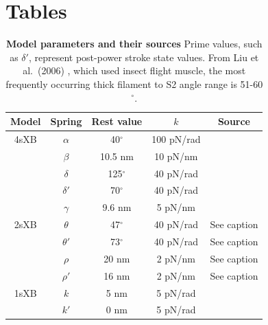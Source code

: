 \documentclass[10pt]{article}
\newcommand{\citep}[1]{\cite{#1}} %
\newcommand{\citet}[1]{\cite{#1}}
\newcommand{\de}{$^\circ$} %
\begin{document}

\clearpage
\section*{Tables} %

\begin{table}[ht]
    \begin{center}
    \begin{tabular}[t]{|c|c|c|c|c|} \hline
    Model & Spring    & Rest value & $k$        & Source \\ \hline %
    4sXB  & $\alpha$  & 40\de      & 100 pN/rad & \citet{Liu2006}      \\ \hline
          & $\beta$   & 10.5 nm    & 10 pN/nm   & \citet{Liu2006}      \\ \hline
          & $\delta$  & 125\de     & 40 pN/rad  & \citet{Taylor1999}   \\ \hline
          & $\delta'$ & 70\de      & 40 pN/rad  & \citet{Taylor1999}   \\ \hline
          & $\gamma$  & 9.6 nm     & 5 pN/nm    & \citet{Houdusse2000} \\ \hline
    2sXB  & $\theta$  & 47\de      & 40 pN/rad  & See caption \\ \hline
          & $\theta'$ & 73\de      & 40 pN/rad  & See caption \\ \hline
          & $\rho$    & 20 nm      & 2 pN/nm    & See caption \\ \hline
          & $\rho'$   & 16 nm      & 2 pN/nm    & See caption \\ \hline
    1sXB  & $k$       & 5 nm       & 5 pN/rad   & \citet{Tanner2007} \\ \hline
          & $k'$      & 0 nm       & 5 pN/rad   & \citet{Tanner2007} \\ \hline
    \end{tabular}
    \caption{ 
	    \label{parameter_table}
	    \textbf{Model parameters and their sources} 
	    Prime values, such as $\delta'$, represent post-power stroke state values. 
	    From Liu et al.~(2006) \citep{Liu2006}, which used insect flight muscle, the most frequently occurring thick filament to S2 angle range is 51-60\de. 
}
\end{center}
\end{table}
\end{document}
